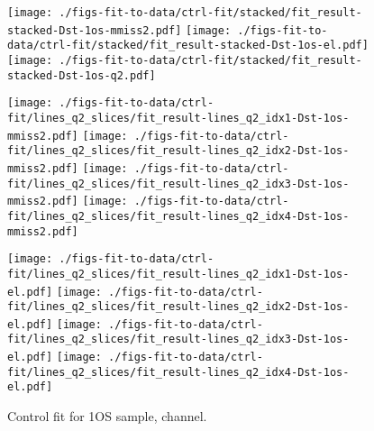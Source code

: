 \begin{figure}[htb]
    \centering
    \texttt{[image: ./figs-fit-to-data/ctrl-fit/stacked/fit\_result-stacked-Dst-1os-mmiss2.pdf]}
    \texttt{[image: ./figs-fit-to-data/ctrl-fit/stacked/fit\_result-stacked-Dst-1os-el.pdf]}
    \texttt{[image: ./figs-fit-to-data/ctrl-fit/stacked/fit\_result-stacked-Dst-1os-q2.pdf]}

    \texttt{[image: ./figs-fit-to-data/ctrl-fit/lines\_q2\_slices/fit\_result-lines\_q2\_idx1-Dst-1os-mmiss2.pdf]}
    \texttt{[image: ./figs-fit-to-data/ctrl-fit/lines\_q2\_slices/fit\_result-lines\_q2\_idx2-Dst-1os-mmiss2.pdf]}
    \texttt{[image: ./figs-fit-to-data/ctrl-fit/lines\_q2\_slices/fit\_result-lines\_q2\_idx3-Dst-1os-mmiss2.pdf]}
    \texttt{[image: ./figs-fit-to-data/ctrl-fit/lines\_q2\_slices/fit\_result-lines\_q2\_idx4-Dst-1os-mmiss2.pdf]}

    \texttt{[image: ./figs-fit-to-data/ctrl-fit/lines\_q2\_slices/fit\_result-lines\_q2\_idx1-Dst-1os-el.pdf]}
    \texttt{[image: ./figs-fit-to-data/ctrl-fit/lines\_q2\_slices/fit\_result-lines\_q2\_idx2-Dst-1os-el.pdf]}
    \texttt{[image: ./figs-fit-to-data/ctrl-fit/lines\_q2\_slices/fit\_result-lines\_q2\_idx3-Dst-1os-el.pdf]}
    \texttt{[image: ./figs-fit-to-data/ctrl-fit/lines\_q2\_slices/fit\_result-lines\_q2\_idx4-Dst-1os-el.pdf]}

    \caption{Control fit for 1OS sample, \Dstar channel.}
    \label{fig:ctrl-1os-dst}
\end{figure}

